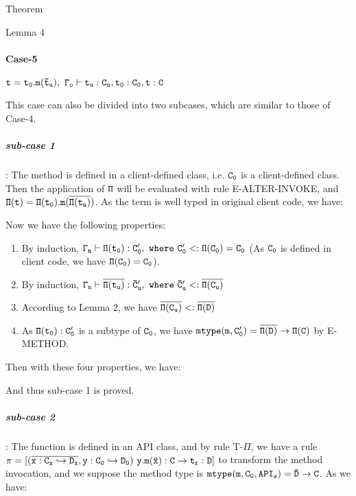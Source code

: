 \documentclass[GBK,winfonts,a4paper,11pt]{article}
\begin{document}
\begin{section}{Theorem}
\begin{subsection}{Lemma 4}
\paragraph{Case-5}
$\tt t=t_0.m(\bar{t}_u),\ \Gamma_o\vdash t_u:C_u, t_0:C_0, t:C$
\par 
This case can also be divided into two subcases, which are similar to those of Case-4.
\subparagraph{sub-case 1}: 
The method is defined in a client-defined class, i.e. $\tt C_0$ is a client-defined class. Then the application of $\tt\Pi$ will be evaluated with rule E-ALTER-INVOKE, and $\tt\Pi(t)=\Pi(t_0).m(\overline{\Pi(t_u)})$. As the term is well typed in original client code, we have:
\begin{center}
\DP
\end{center}
Now we have the following properties:
\begin{enumerate}
\item By induction, $\tt\Gamma_n\vdash\Pi(t_0):C'_0,\ where\ C'_0<:\Pi(C_0)=C_0$ (As $\tt C_0$ is defined in client code, we have $\tt \Pi(C_0)=C_0$).
\item By induction, $\tt\Gamma_n\vdash\overline{\Pi(t_u)} :\bar{C}'_u,\ where\ \bar{C}'_u <: \overline{\Pi(C_u)}$
\item According to Lemma 2, we have $\tt \overline{\Pi(C_u)}<:\overline{\Pi(D)}$
\item As $\tt \Pi(t_0):C'_0$ is a subtype of $\tt C_0$, we have $\tt mtype(m,C'_0)=\overline{\Pi(D)}\rightarrow \Pi(C)$ by E-METHOD.
\end{enumerate}
Then with these four properties, we have:
\begin{center}
\DP
\end{center}
And thus sub-case 1 is proved.
\subparagraph{sub-case 2}:
The function is defined in an API class, and by rule T-$\Pi$, we have a rule 
$\tt \pi=[(\overline{x:C_x\hookrightarrow D_x}, y:C_0\hookrightarrow D_0)\ y.m(\bar{x}):C \rightarrow t_r:D]$ to transform the method invocation, and we suppose the method type is $\tt mtype(m,C_0,API_s)=\bar{D}\rightarrow C$.
As we have:
\begin{center}
\DP
\end{center}


\end{subsection}
\end{section}
\end{document}
